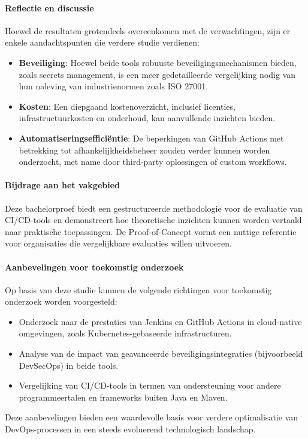 \paragraph{Reflectie en discussie}
Hoewel de resultaten grotendeels overeenkomen met de verwachtingen, zijn er enkele aandachtspunten die verdere studie verdienen:
\begin{itemize}
    \item \textbf{Beveiliging}: Hoewel beide tools robuuste beveiligingsmechanismen bieden, zoals secrets management, is een meer gedetailleerde vergelijking nodig van hun naleving van industrienormen zoals ISO 27001.
    \item \textbf{Kosten}: Een diepgaand kostenoverzicht, inclusief licenties, infrastructuurkosten en onderhoud, kan aanvullende inzichten bieden.
    \item \textbf{Automatiseringsefficiëntie}: De beperkingen van GitHub Actions met betrekking tot afhankelijkheidsbeheer zouden verder kunnen worden onderzocht, met name door third-party oplossingen of custom workflows.
\end{itemize}

\paragraph{Bijdrage aan het vakgebied}
Deze bachelorproef biedt een gestructureerde methodologie voor de evaluatie van CI/CD-tools en demonstreert hoe theoretische inzichten kunnen worden vertaald naar praktische toepassingen. De Proof-of-Concept vormt een nuttige referentie voor organisaties die vergelijkbare evaluaties willen uitvoeren.

\paragraph{Aanbevelingen voor toekomstig onderzoek}
Op basis van deze studie kunnen de volgende richtingen voor toekomstig onderzoek worden voorgesteld:
\begin{itemize}
    \item Onderzoek naar de prestaties van Jenkins en GitHub Actions in cloud-native omgevingen, zoals Kubernetes-gebaseerde infrastructuren.
    \item Analyse van de impact van geavanceerde beveiligingsintegraties (bijvoorbeeld DevSecOps) in beide tools.
    \item Vergelijking van CI/CD-tools in termen van ondersteuning voor andere programmeertalen en frameworks buiten Java en Maven.
\end{itemize}

Deze aanbevelingen bieden een waardevolle basis voor verdere optimalisatie van DevOps-processen in een steeds evoluerend technologisch landschap.